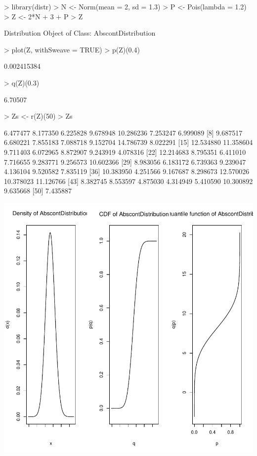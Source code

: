 \documentclass[11pt]{article}
\begin{document}
\begin{Schunk}
\begin{Sinput}
> library(distr)
> N <- Norm(mean = 2, sd = 1.3)
> P <- Pois(lambda = 1.2)
> Z <- 2*N + 3 + P
> Z
\end{Sinput}
\begin{Soutput}
Distribution Object of Class: AbscontDistribution
\end{Soutput}
\begin{Sinput}
> plot(Z, withSweave = TRUE)
> p(Z)(0.4)
\end{Sinput}
\begin{Soutput}
[1] 0.002415384
\end{Soutput}
\begin{Sinput}
> q(Z)(0.3)
\end{Sinput}
\begin{Soutput}
[1] 6.70507
\end{Soutput}
\begin{Sinput}
> Zs <- r(Z)(50)
> Zs
\end{Sinput}
\begin{Soutput}
 [1]  6.477477  8.177350  6.225828  9.678948 10.286236  7.253247  6.999089
 [8]  9.687517  6.680221  7.855183  7.088718  9.152704 14.786739  8.022291
[15] 12.534880 11.358604  9.711403  6.072965  8.872907  9.243919  4.078316
[22] 12.214683  8.795351  6.411010  7.716655  9.283771  9.256573 10.602366
[29]  8.983056  6.183172  6.739363  9.239047  4.136104  9.520582  7.835119
[36] 10.383950  4.251566  9.167687  8.298673 12.570026 10.378023 11.126766
[43]  8.382745  8.553597  4.875030  4.314949  5.410590 10.300892  9.635668
[50]  7.435887
\end{Soutput}
\end{Schunk}
\includegraphics{distr-exam1}
\end{document}
